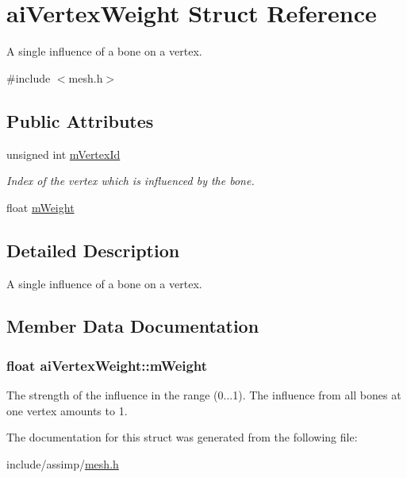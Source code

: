 \hypertarget{structaiVertexWeight}{\section{ai\-Vertex\-Weight \-Struct \-Reference}
\label{structaiVertexWeight}
}


\-A single influence of a bone on a vertex.  




{\ttfamily \#include $<$mesh.\-h$>$}

\subsection*{\-Public \-Attributes}
\begin{DoxyCompactItemize}
\item 
\hypertarget{structaiVertexWeight_af6269cf6a0f02e5ae870a72046d58f4f}{unsigned int \hyperlink{structaiVertexWeight_af6269cf6a0f02e5ae870a72046d58f4f}{m\-Vertex\-Id}}\label{structaiVertexWeight_af6269cf6a0f02e5ae870a72046d58f4f}

\begin{DoxyCompactList}\small\item\em \-Index of the vertex which is influenced by the bone. \end{DoxyCompactList}\item 
float \hyperlink{structaiVertexWeight_abab9c49baabc2cafef9ac840f59e61b8}{m\-Weight}
\end{DoxyCompactItemize}


\subsection{\-Detailed \-Description}
\-A single influence of a bone on a vertex. 

\subsection{\-Member \-Data \-Documentation}
\hypertarget{structaiVertexWeight_abab9c49baabc2cafef9ac840f59e61b8}{
\subsubsection[{m\-Weight}]{\setlength{\rightskip}{0pt plus 5cm}float {\bf ai\-Vertex\-Weight\-::m\-Weight}}}\label{structaiVertexWeight_abab9c49baabc2cafef9ac840f59e61b8}
\-The strength of the influence in the range (0...1). \-The influence from all bones at one vertex amounts to 1. 

\-The documentation for this struct was generated from the following file\-:\begin{DoxyCompactItemize}
\item 
include/assimp/\hyperlink{mesh_8h}{mesh.\-h}\end{DoxyCompactItemize}
